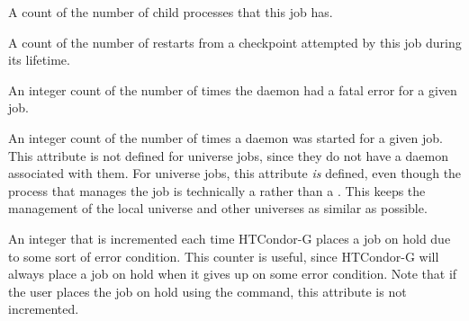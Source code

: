 \begin{description}
\item[\AdAttr{NumPids}:]  A count of the number of child processes that
this job has.

\item[\AdAttr{NumRestarts}:]  A count of the number of restarts from a
checkpoint attempted by this job during its lifetime.

\item[\AdAttr{NumShadowExceptions}:]  An integer count of the number of
  times the  daemon had a fatal error for a given job.

\item[\AdAttr{NumShadowStarts}:]  An integer count of the number of
  times a  daemon was started for a given job.
  This attribute is not defined for
   universe jobs, since
  they do not have a  daemon associated with them.
  For  universe jobs, this attribute \emph{is}
  defined, even though the process that manages the job is technically
  a  rather than a .  
  This keeps the management of the
  local universe and other universes as similar as possible.

\item[\AdAttr{NumSystemHolds}:]   An integer that is incremented each time
HTCondor-G places a job on hold due to some sort of error condition.  This
counter is useful, since HTCondor-G will always place a job on hold when it
gives up on some error condition.  Note that if the user places the job
on hold using the  command, this attribute is not incremented.


\end{description}
